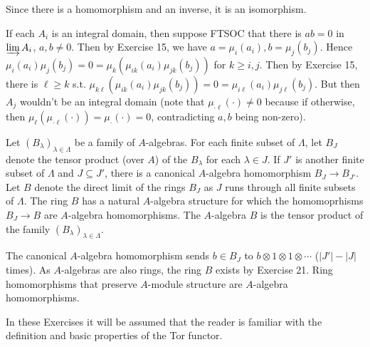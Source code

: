 \documentclass[a4paper]{exam}
\begin{document}
\begin{questions}
\begin{solution}
		Since there is a homomorphism and an inverse, it is an isomorphism.

		If each $A_i$ is an integral domain, then suppose FTSOC that there is $ab = 0$ in $\varinjlim A_i $, $a,b\ne 0$.
		Then by Exercise 15, we have $a = \mu_i(a_i),b=\mu_j(b_j)$.
		Hence $\mu _i(a_i)\mu _j(b_j) = 0 = \mu _k(\mu _{ik}(a_i)\mu _{jk}(b_j))$ for $k\ge i,j$.
		Then by Exercise 15, there is $\ell\ge k$ s.t. $\mu _{k\ell}(\mu _{ik}(a_i)\mu _{jk}(b_j)) = 0 = \mu _{i\ell}(a_i)\mu _{j\ell}(b_j)$.
		But then $A_j$ wouldn't be an integral domain (note that $\mu _{\cdot \ell}(\cdot) \ne 0$ because if otherwise, then $\mu _\ell(\mu _{\cdot \ell}(\cdot)) = \mu_{\cdot}(\cdot) = 0$, contradicting $a,b$ being non-zero).
	\end{solution}

	\question Let $(B_{\lambda })_{\lambda \in \Lambda}$ be a family of $A$-algebras. For each finite subset of $\Lambda $, let $B_J$ denote the tensor product (over $A $) of the $B_{\lambda}$ for each $\lambda \in J$. If $J'$ is another finite subset of $\Lambda$ and $J\subseteq J' $, there is a canonical $A$-algebra homomorphism $B_J\to B_{J'}$. Let $B$ denote the direct limit of the rings $B_J$ as $J$ runs through all finite subsets of $\Lambda$. The ring $B$ has a natural $A$-algebra structure for which the homomoprhisms $B_J\to B$ are $A$-algebra homomorphisms. The $A$-algebra $B$ is the tensor product of the family $(B_{\lambda})_{\lambda\in \Lambda}$.
	\begin{solution}
		The canonical $A$-algebra homomorphism sends $b\in B_J$ to $b \otimes 1 \otimes 1 \otimes \cdots$ ($|J'| - |J|$ times).
		As $A$-algebras are also rings, the ring $B$ exists by Exercise 21.
		Ring homomorphisms that preserve $A$-module structure are $A$-algebra homomorphisms.
	\end{solution}

	\question In these Exercises it will be assumed that the reader is familiar with the definition and basic properties of the Tor functor.


\end{questions}
\end{document}
